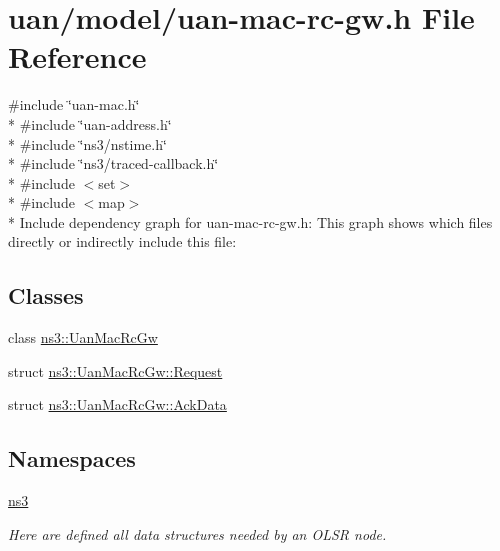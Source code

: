 \hypertarget{uan-mac-rc-gw_8h}{}\section{uan/model/uan-\/mac-\/rc-\/gw.h File Reference}
\label{uan-mac-rc-gw_8h}
{\ttfamily \#include \char`\"{}uan-\/mac.\+h\char`\"{}}\\*
{\ttfamily \#include \char`\"{}uan-\/address.\+h\char`\"{}}\\*
{\ttfamily \#include \char`\"{}ns3/nstime.\+h\char`\"{}}\\*
{\ttfamily \#include \char`\"{}ns3/traced-\/callback.\+h\char`\"{}}\\*
{\ttfamily \#include $<$set$>$}\\*
{\ttfamily \#include $<$map$>$}\\*
Include dependency graph for uan-\/mac-\/rc-\/gw.h\+:
This graph shows which files directly or indirectly include this file\+:
\subsection*{Classes}
\begin{DoxyCompactItemize}
\item 
class \hyperlink{classns3_1_1UanMacRcGw}{ns3\+::\+Uan\+Mac\+Rc\+Gw}
\item 
struct \hyperlink{structns3_1_1UanMacRcGw_1_1Request}{ns3\+::\+Uan\+Mac\+Rc\+Gw\+::\+Request}
\item 
struct \hyperlink{structns3_1_1UanMacRcGw_1_1AckData}{ns3\+::\+Uan\+Mac\+Rc\+Gw\+::\+Ack\+Data}
\end{DoxyCompactItemize}
\subsection*{Namespaces}
\begin{DoxyCompactItemize}
\item 
 \hyperlink{namespacens3}{ns3}
\begin{DoxyCompactList}\small\item\em Here are defined all data structures needed by an O\+L\+SR node. \end{DoxyCompactList}\end{DoxyCompactItemize}
